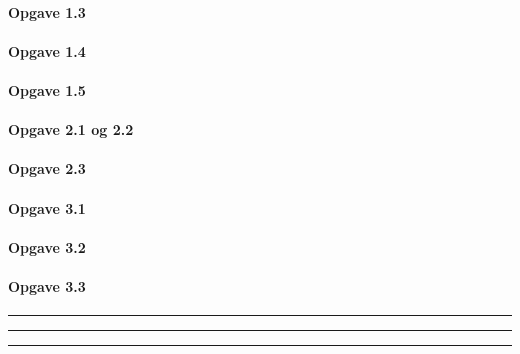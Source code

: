 \documentclass[]{book}
\let\oldparagraph\paragraph
\renewcommand{\paragraph}[1]{\oldparagraph{#1}\mbox{}}
\begin{document}
\hypertarget{opgave-1.3}{%
\paragraph{Opgave 1.3}\label{opgave-1.3}}

\hypertarget{opgave-1.4}{%
\paragraph{Opgave 1.4}\label{opgave-1.4}}

\hypertarget{opgave-1.5}{%
\paragraph{Opgave 1.5}\label{opgave-1.5}}

\hypertarget{opgave-2.1-og-2.2}{%
\paragraph{Opgave 2.1 og 2.2}\label{opgave-2.1-og-2.2}}

\hypertarget{opgave-2.3}{%
\paragraph{Opgave 2.3}\label{opgave-2.3}}

\hypertarget{opgave-3.1}{%
\paragraph{Opgave 3.1}\label{opgave-3.1}}

\hypertarget{opgave-3.2}{%
\paragraph{Opgave 3.2}\label{opgave-3.2}}

\hypertarget{opgave-3.3}{%
\paragraph{Opgave 3.3}\label{opgave-3.3}}

\begin{center}\rule{0.5\linewidth}{\linethickness}\end{center}

\begin{center}\rule{0.5\linewidth}{\linethickness}\end{center}

\begin{center}\rule{0.5\linewidth}{\linethickness}\end{center}
\end{document}
